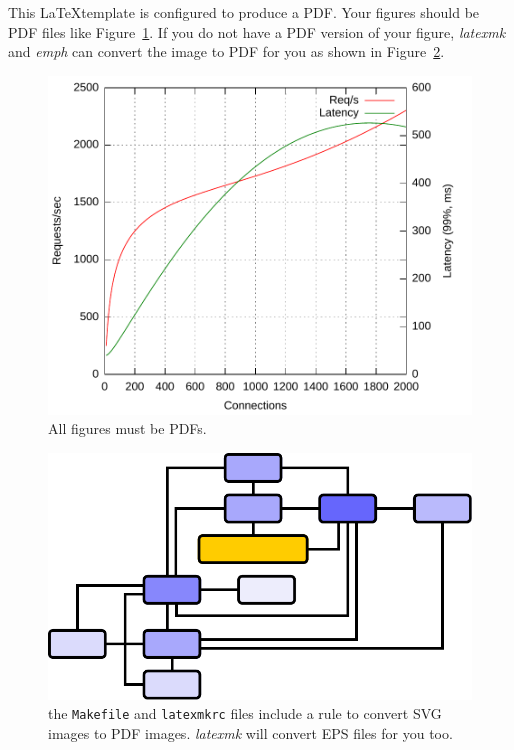 This \LaTeX template is configured to produce a PDF.
Your figures should be PDF files like Figure~\ref{fig:pdf}.
If you do not have a PDF version of your figure, \emph{latexmk} and \emph{emph} can convert the image to PDF for you as shown in Figure~\ref{fig:svg}.

\begin{figure}
  \centering
  \includegraphics{figures/just-a-plot}
  \caption[Figures must be PDF]{All figures must be PDFs.}
  \label{fig:pdf}
\end{figure}

\begin{figure}
  \centering
  \includegraphics{figures/just-a-graph}
  \caption[SVG converted to PDF]{the \texttt{Makefile} and \texttt{latexmkrc} files include a rule to convert SVG images to PDF images.
	\emph{latexmk} will convert EPS files for you too.}
  \label{fig:svg}
\end{figure}

